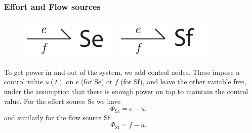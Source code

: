 \documentclass[11pt,reqno]{beamer}
\begin{document}
\begin{frame}
\frametitle{Effort and Flow sources}

\begin{figure}
	\begin{minipage}{0.4\textwidth}
	\includegraphics{images/oneport-Se.pdf}
	\end{minipage}
	\begin{minipage}{0.4\textwidth}
	\includegraphics{images/oneport-Sf.pdf}
\end{minipage}
\end{figure}
To get power in and out of the system, we add control nodes. These impose a control value $u(t)$ on $e$ (for Se) or $f$ (for Sf), and leave the other variable free, under the assumption that there is enough power on tap to maintain the control value. 
For the effort source Se we have
\[
\Phi_\text{Se} = e - u.
\]
and similarly for the flow source Sf
\[
\Phi_\text{Sf} = f - u.
\]
\end{frame}
\end{document}
